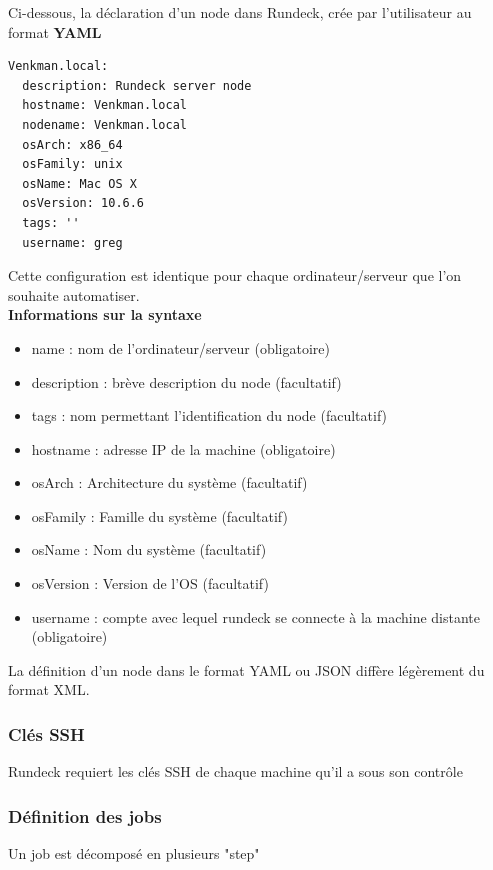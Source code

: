 \documentclass[12pt]{article}
\begin{document}
\vspace{0.5cm}
Ci-dessous, la déclaration d'un node dans Rundeck, crée par l'utilisateur au format \textbf{YAML}
\vspace{0.5cm}
\\

\begin{lstlisting}
Venkman.local:
  description: Rundeck server node
  hostname: Venkman.local
  nodename: Venkman.local
  osArch: x86_64
  osFamily: unix
  osName: Mac OS X
  osVersion: 10.6.6
  tags: ''
  username: greg
\end{lstlisting}

\vspace{0.5cm}
Cette configuration est identique pour chaque ordinateur/serveur que l'on souhaite automatiser.
\vspace{0.5cm}
\\
\textbf{Informations sur la syntaxe}
\begin{itemize}
    \item name : nom de l'ordinateur/serveur (obligatoire)
    \item description : brève description du node (facultatif)
    \item tags : nom permettant l'identification du node (facultatif)
    \item hostname : adresse IP de la machine (obligatoire)
    \item osArch : Architecture du système (facultatif)
    \item osFamily : Famille du système (facultatif)
    \item osName : Nom du système (facultatif)
    \item osVersion : Version de l'OS (facultatif)
    \item username : compte avec lequel rundeck se connecte à la machine distante (obligatoire)
\end{itemize}
\vspace{0.5cm}
La définition d'un node dans le format YAML ou JSON diffère légèrement du format XML.
\subsubsection{Clés SSH}
Rundeck requiert les clés SSH de chaque machine qu'il a sous son contrôle

\subsubsection{Définition des jobs}
Un job est décomposé en plusieurs "step"
\end{document}
